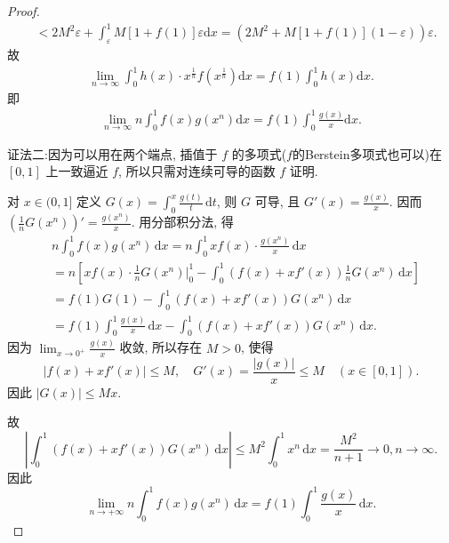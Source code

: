 \documentclass[../../main.tex]{subfiles}
\begin{document}
\begin{proof}
\begin{align*}
&<2M^2\varepsilon+\int_{\varepsilon}^1 M\left[1+f(1)\right]\varepsilon\mathrm{d}x=\left(2M^2+M\left[1+f(1)\right]\left(1-\varepsilon\right)\right)\varepsilon.
\end{align*}
故
\begin{align*}
\lim\limits_{n\rightarrow \infty}\int_0^1 h(x)\cdot x^{\frac{1}{n}}f\left(x^{\frac{1}{n}}\right)\mathrm{d}x=f(1)\int_0^1 h(x)\mathrm{d}x.
\end{align*}
即
\begin{align*}
\lim_{n\rightarrow \infty}n\int_0^1 f(x)g(x^n)\mathrm{d}x=f(1)\int_0^1 \frac{g(x)}{x}\mathrm{d}x.
\end{align*}

{\color{blue}证法二:}因为可以用在两个端点, 插值于 \( f \) 的多项式($f$的Berstein多项式也可以)在 \([0,1]\) 上一致逼近 \( f \), 所以只需对连续可导的函数 \( f \) 证明.

对 \( x \in (0,1] \) 定义 \( G(x) = \int_{0}^{x} \frac{g(t)}{t} \, \mathrm{d}t \), 则 \( G \) 可导, 且 \( G'(x) = \frac{g(x)}{x} \). 因而 \( \left( \frac{1}{n} G(x^n) \right)' = \frac{g(x^n)}{x} \). 用分部积分法, 得
\[
\begin{aligned}
&n \int_{0}^{1} f(x) g(x^n) \, \mathrm{d}x = n \int_{0}^{1} x f(x) \cdot \frac{g(x^n)}{x} \, \mathrm{d}x \\
&= n \left[ x f(x) \cdot \frac{1}{n} G(x^n) \bigg|_{0}^{1} - \int_{0}^{1} \left( f(x) + x f'(x) \right) \frac{1}{n} G(x^n) \, \mathrm{d}x \right] \\
&= f(1) G(1) - \int_{0}^{1} \left( f(x) + x f'(x) \right) G(x^n) \, \mathrm{d}x \\
&= f(1) \int_{0}^{1} \frac{g(x)}{x} \, \mathrm{d}x - \int_{0}^{1} \left( f(x) + x f'(x) \right) G(x^n) \, \mathrm{d}x.
\end{aligned}
\]
因为 \( \lim_{x \to 0^+} \frac{g(x)}{x} \) 收敛, 所以存在 \( M > 0 \), 使得
\[
|f(x) + x f'(x)| \leqslant M, \quad G'(x)=\frac{|g(x)|}{x} \leqslant M \quad (x \in [0,1]).
\]
因此 \( |G(x)| \leqslant M x \).

故
\[
\left| \int_{0}^{1} \left( f(x) + x f'(x) \right) G(x^n) \, \mathrm{d}x \right| \leqslant M^2 \int_{0}^{1} x^n \, \mathrm{d}x = \frac{M^2}{n + 1}\to 0,n\to \infty.
\]
因此
\[
\lim_{n \to +\infty} n \int_{0}^{1} f(x) g(x^n) \, \mathrm{d}x = f(1) \int_{0}^{1} \frac{g(x)}{x} \, \mathrm{d}x.
\]
\end{proof}
\end{document}

